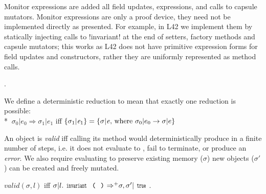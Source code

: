 
\noindent Monitor expressions are added  all field updates, \Q@new@ expressions, and calls to capsule mutators.
Monitor expressions are only a proof device, they need not be implemented directly as presented.
For example, in L42 we implement them by statically injecting calls to \Q!invariant! at the end of setters, factory methods and capsule mutators; this works as L42 does not have primitive expression forms for field updates and constructors, rather they are uniformly represented as method calls.

.

We define a deterministic reduction to mean that exactly one reduction is possible:\\*
\indent$\ \sigma_0|e_0\Rightarrow \sigma_1|e_1$ iff $\{\sigma_1|{\mathit{e}}_1\}=\{\sigma|{\mathit{e}} \text{, where } \sigma_0|e_0\rightarrow \sigma|e\}$

\noindent An object is \emph{valid} iff calling its \Q@invariant@ method would
deterministically produce \Q@true@ in a finite number of steps, i.e. it does not evaluate to \Q@false@, fail to terminate, or produce an \emph{error}.
We also require evaluating \Q@invariant@ to preserve existing memory ($\sigma$) new objects ($\sigma'$) can be created and freely mutated.

\indent$\mathit{valid}(\sigma,l)$ iff $\sigma | l.\invariant {\Rightarrow^+} \sigma,\sigma' | \Kw{true}$.\loseSpace
{}


